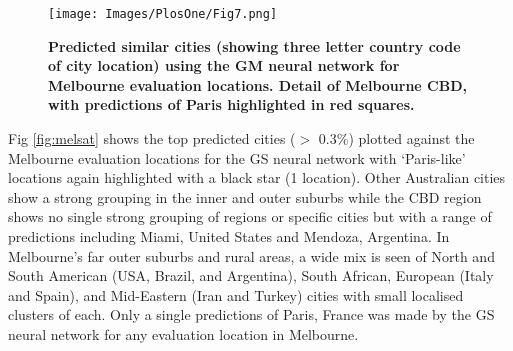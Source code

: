 \documentclass[Crown,sageh,times]{sagej}
\begin{document}
\begin{figure}[!htbp]
\centering     
\texttt{[image: Images/PlosOne/Fig7.png]} 
\caption{\bf Predicted similar cities (showing three letter country code of city location) using the GM neural network for Melbourne evaluation locations. Detail of Melbourne CBD, with predictions of Paris highlighted in red squares.}    
 \label{fig:melmapscbd}  
\end{figure} 


Fig \ref{fig:melsat} shows the top predicted cities ($>$ 0.3\%) plotted against the Melbourne evaluation locations for the GS neural network with `Paris-like' locations again highlighted with a black star (1 location). Other Australian cities show a strong grouping in the inner and outer suburbs while the CBD region shows no single strong grouping of regions or specific cities but with a range of predictions including Miami, United States and Mendoza, Argentina. In Melbourne's far outer suburbs and rural areas, a wide mix is seen of North and South American (USA, Brazil, and Argentina), South African, European (Italy and Spain), and Mid-Eastern (Iran and Turkey) cities with small localised clusters of each. Only a single predictions of Paris, France was made by the GS neural network for any evaluation location in Melbourne.
\end{document}
